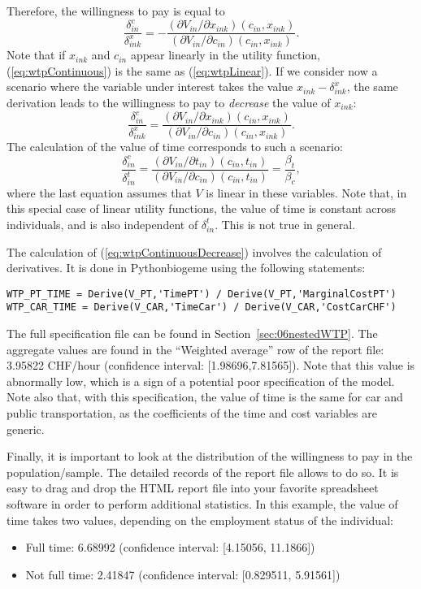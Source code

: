 \documentclass[12pt,a4paper]{article}
\newcommand{\req}[1]{(\ref{#1})}
\begin{document}
Therefore, the willingness to pay is equal to 
\begin{equation}
  \label{eq:wtpContinuous}
\frac{\delta^c_{in}}{ \delta^x_{ink}} = - \frac{(\partial V_{in}/\partial x_{ink})(c_{in},x_{ink})}{(\partial V_{in}/\partial c_{in})(c_{in},x_{ink})}.
\end{equation}
Note that if $x_{ink}$ and $c_{in}$ appear linearly in the utility
function, \req{eq:wtpContinuous} is the same as \req{eq:wtpLinear}.
If we consider now a scenario where the variable under interest takes the value
$x_{ink} - \delta^x_{ink}$, the same derivation leads to the
willingness to pay to \emph{decrease} the value of $x_{ink}$:
\begin{equation}
  \label{eq:wtpContinuousDecrease}
\frac{\delta^c_{in}}{ \delta^x_{ink}} = \frac{(\partial V_{in}/\partial x_{ink})(c_{in},x_{ink})}{(\partial V_{in}/\partial c_{in})(c_{in},x_{ink})}.
\end{equation}
The calculation of the value of time corresponds to such a scenario:
\begin{equation}
\frac{\delta^c_{in}}{ \delta^t_{in}} =  \frac{(\partial V_{in}/\partial t_{in})(c_{in},t_{in})}{(\partial V_{in}/\partial c_{in})(c_{in},t_{in})} = \frac{\beta_t}{\beta_c},
\end{equation}
where the last equation assumes that $V$ is linear in these variables.
Note that, in this special case of linear utility functions, the value
of time is constant across individuals, and is also independent of
$\delta^t_{in}$. This is not true in general.

The calculation of \req{eq:wtpContinuousDecrease} involves the
calculation of derivatives. It is done in Pythonbiogeme using the
following statements:
\begin{lstlisting}
WTP_PT_TIME = Derive(V_PT,'TimePT') / Derive(V_PT,'MarginalCostPT')
WTP_CAR_TIME = Derive(V_CAR,'TimeCar') / Derive(V_CAR,'CostCarCHF')
\end{lstlisting}
The full specification file can be found in
Section~\ref{sec:06nestedWTP}. The aggregate values are found in the
``Weighted average'' row of the report file:
3.95822 CHF/hour (confidence interval:
[1.98696,7.81565]). Note that this value is abnormally low, which is a
sign of a potential poor specification of the model. 
Note also that, with this specification, the value of time is the same for
car and public transportation, as the coefficients of the time and
cost variables are generic.

Finally, it is important to look at the distribution of the
willingness to pay in the population/sample. The detailed records of
the report file allows  to do so. It is easy to drag and drop the
HTML report file into your favorite spreadsheet software in order to
perform additional statistics. In this example, the value of time
takes two values, depending on the employment status of the individual:
\begin{itemize}
\item Full time: 6.68992 (confidence interval:	[4.15056, 11.1866])
\item Not full time: 2.41847 (confidence interval: [0.829511, 5.91561])
\end{itemize}
\end{document}
